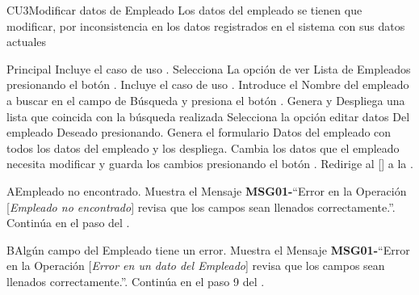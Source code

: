 \begin{UseCase}{CU3}{Modificar datos de  Empleado}{
		Los datos del empleado se tienen que modificar, por inconsistencia en los datos registrados en el sistema con sus datos actuales
	}
	\end{UseCase}
	\begin{UCtrayectoria}{Principal}
		\UCpaso Incluye el  caso de uso .
		\UCpaso[\UCactor] Selecciona La opción de ver Lista de  Empleados presionando el botón .
		\UCpaso Incluye el caso de uso .
		\UCpaso[\UCactor] Introduce el Nombre del empleado a buscar en el campo de Búsqueda y presiona el botón   .
		\UCpaso Genera y Despliega una lista que coincida con la búsqueda realizada
		\UCpaso[\UCactor] Selecciona la opción editar datos Del empleado Deseado presionando.
		\UCpaso Genera el formulario Datos del empleado con todos los datos del empleado y los despliega.
		\UCpaso[\UCactor] Cambia los datos que el empleado necesita modificar y guarda los cambios presionando el botón  .
		\UCpaso Redirige al [\UCactor] a la  .
	\end{UCtrayectoria}




\begin{UCtrayectoriaA}{A}{Empleado no encontrado.}
			\UCpaso Muestra el Mensaje {\bf MSG01-}``Error en la Operación [{\em Empleado no encontrado}] revisa que los campos sean llenados correctamente.''.
			\UCpaso Continúa en el paso  del .
		\end{UCtrayectoriaA}


\begin{UCtrayectoriaA}{B}{Algún campo del Empleado tiene un error.}
			\UCpaso Muestra el Mensaje {\bf MSG01-}``Error en la Operación [{\em Error en un dato del Empleado}] revisa que los campos sean llenados correctamente.''.
			\UCpaso Continúa en el paso 9 del .
		\end{UCtrayectoriaA}
